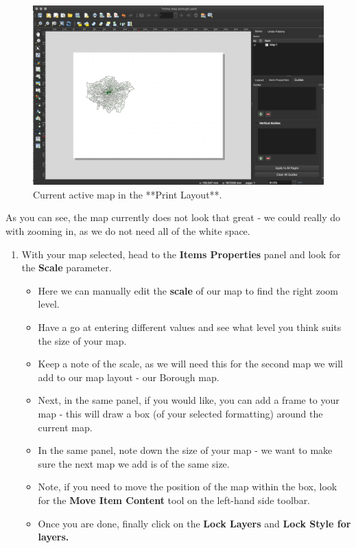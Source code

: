 \documentclass[
]{book}
\providecommand{\tightlist}{%
  \setlength{\itemsep}{0pt}\setlength{\parskip}{0pt}}
\begin{document}
\begin{figure}

{\centering \includegraphics[width=0.9\linewidth]{images/w03/map_layout} 

}

\caption{Current active map in the **Print Layout**.}\label{fig:03-map-print-layout}
\end{figure}

As you can see, the map currently does not look that great - we could really do with zooming in, as we do not need all of the white space.

\begin{enumerate}
\def\labelenumi{\arabic{enumi}.}
\setcounter{enumi}{1}
\tightlist
\item
  With your map selected, head to the \textbf{Items Properties} panel and look for the \textbf{Scale} parameter.

  \begin{itemize}
  \tightlist
  \item
    Here we can manually edit the \textbf{scale} of our map to find the right zoom level.
  \item
    Have a go at entering different values and see what level you think suits the size of your map.
  \item
    Keep a note of the scale, as we will need this for the second map we will add to our map layout - our Borough map.
  \item
    Next, in the same panel, if you would like, you can add a frame to your map - this will draw a box (of your selected formatting) around the current map.
  \item
    In the same panel, note down the size of your map - we want to make sure the next map we add is of the same size.
  \item
    Note, if you need to move the position of the map within the box, look for the \textbf{Move Item Content} tool on the left-hand side toolbar.
  \item
    Once you are done, finally click on the \textbf{Lock Layers} and \textbf{Lock Style for layers.}
  \end{itemize}
\end{enumerate}
\end{document}
